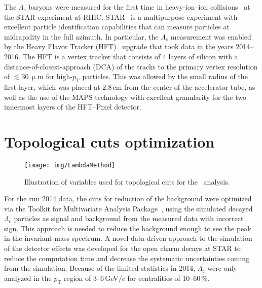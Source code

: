 The $\Lambda_\mathrm{c}$ baryons were measured for the first time in heavy-ion--ion collisions~\cite{GuannanLc} at the STAR experiment at RHIC\@. STAR~\cite{STARoverview} is a multipurpose experiment with excellent particle identification capabilities that can measure particles at midrapidity in the full azimuth. In particular, the $\Lambda_\mathrm{c}$ measurement was enabled by the Heavy Flavor Tracker (HFT)~\cite{Kapitan} upgrade that took data in the years 2014--2016\@. The HFT is a vertex tracker that consists of 4 layers of silicon with a distance-of-closest-approach (DCA) of the tracks to the primary vertex resolution of $\lesssim$30$\,\upmu$m for high-$p_\mathrm{T}$ particles. This was allowed by the small radius of the first layer, which was placed at 2.8$\,$cm from the center of the accelerator tube, as well as the use of the MAPS technology with excellent granularity for the two innermost layers of the HFT--Pixel detector.



\section{Topological cuts optimization}

\begin{figure}[htb]
\centering
\texttt{[image: img/LambdaMethod]}
\caption{Illustration of variables used for topological cuts for the \Lambdac\ analysis.}
\label{fig:method}
\end{figure}

For the run 2014 data, the cuts for reduction of the background were optimized via the Toolkit for Multivariate Analysis Package~\cite{TMVA}, using the simulated decayed $\Lambda_\mathrm{c}$ particles as signal and background from the measured data with incorrect sign. This approach is needed to reduce the background enough to see the peak in the invariant mass spectrum. A novel data-driven approach to the simulation of the detector effects was developed for the open charm decays at STAR to reduce the computation time and decrease the systematic uncertainties coming from the simulation. Because of the limited statistics in 2014, $\Lambda_\mathrm{c}$ were only analyzed in the $p_\mathrm{T}$ region of 3--6$\,$GeV$/c$ for centralities of 10--60$\,\%$\@.

